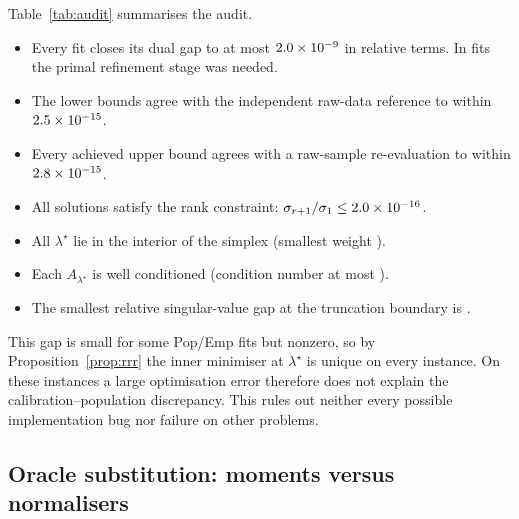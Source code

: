 \begin{table}[t]
\caption{Numerical audit of the \STwoNFits{} minimax fits in stage~2, by arm. The relative gap is
$(\mathrm{UB}-\mathrm{LB})/\mathrm{UB}$ on the fitted objective. The second column of numbers
compares the lower bound with an independent reduced-rank regression computed from raw samples at
the same $\lambda^\star$. The last three columns are the smallest task weight, the largest
condition number of $A_{\lambda^\star}$, and the smallest relative singular-value gap at the
truncation boundary. Floating-point values, not certificates.}
\label{tab:audit}
\centering\small
\resizebox{\linewidth}{!}{}
\end{table}

Table~\ref{tab:audit} summarises the audit.
\begin{itemize}
\item Every fit closes its dual gap to at most $2.0\times10^{-9}$ in relative terms. In
\STwoNRefined{} fits the primal refinement stage was needed.
\item The lower bounds agree with the independent raw-data reference to within $2.5\times10^{-15}$.
\item Every achieved upper bound agrees with a raw-sample re-evaluation to within $2.8\times10^{-15}$.
\item All solutions satisfy the rank constraint: $\sigma_{r+1}/\sigma_1\le2.0\times10^{-16}$.
\item All $\lambda^\star$ lie in the interior of the simplex (smallest weight \STwoMinLambda).
\item Each $A_{\lambda^\star}$ is well conditioned (condition number at most \STwoMaxCond).
\item The smallest relative singular-value gap at the truncation boundary is \STwoMinSvGap.
\end{itemize}
This gap is small for some Pop/Emp fits but nonzero, so by Proposition~\ref{prop:rrr} the inner
minimiser at $\lambda^\star$ is unique on every instance. On these instances a large optimisation
error therefore does not explain the calibration--population discrepancy. This rules out neither
every possible implementation bug nor failure on other problems.

\subsection{Oracle substitution: moments versus normalisers}

\begin{table}[t]
\caption{Paired difference $\Delta=F(\What_{\mathrm{minimax}})-F(\What_{\mathrm{uniform}})$ on
the population objective; negative values favour minimax. The teacher columns average the
\CfgNResamples{} fresh draws of that teacher, and the last column averages all \CfgNewCells{}
nested cells. Pop/Pop does not depend on the draw and is computed once per teacher.}
\label{tab:2x2}
\centering\small

\end{table}

